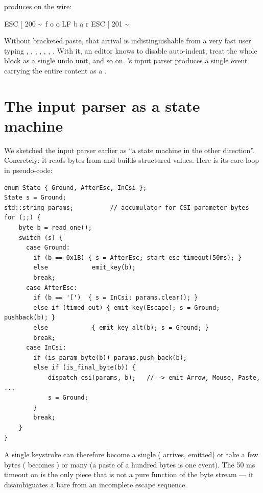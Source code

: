produces on the wire:

\begin{terminalbox}
ESC [ 200 \textasciitilde~f o o LF b a r ESC [ 201 \textasciitilde
\end{terminalbox}

Without bracketed paste, that arrival is indistinguishable from a
very fast user typing , , , ,
, , . With it, an editor knows to disable
auto-indent, treat the whole block as a single undo unit, and so
on. \maya{}'s input parser produces a single  event
carrying the entire content as a .

\section{The input parser as a state machine}
\label{sec:term:input-fsm}

We sketched the input parser earlier as ``a state machine in the
other direction''. Concretely: it reads bytes from  and
builds structured  values. Here is its core loop in
pseudo-code:

\begin{lstlisting}
enum State { Ground, AfterEsc, InCsi };
State s = Ground;
std::string params;          // accumulator for CSI parameter bytes
for (;;) {
    byte b = read_one();
    switch (s) {
      case Ground:
        if (b == 0x1B) { s = AfterEsc; start_esc_timeout(50ms); }
        else            emit_key(b);
        break;
      case AfterEsc:
        if (b == '[')  { s = InCsi; params.clear(); }
        else if (timed_out) { emit_key(Escape); s = Ground; pushback(b); }
        else            { emit_key_alt(b); s = Ground; }
        break;
      case InCsi:
        if (is_param_byte(b)) params.push_back(b);
        else if (is_final_byte(b)) {
            dispatch_csi(params, b);   // -> emit Arrow, Mouse, Paste, ...
            s = Ground;
        }
        break;
    }
}
\end{lstlisting}

A single keystroke can therefore become a single 
( arrives,  emitted) or take a few
bytes (\code{ESC [ A} becomes ) or many
(a paste of a hundred bytes is one  event). The 50 ms
timeout on  is the only piece that is not a pure function
of the byte stream --- it disambiguates a bare  from
an incomplete escape sequence.

